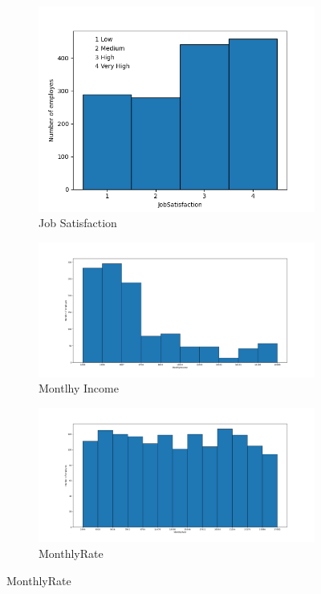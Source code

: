 \documentclass[english]{article}
\begin{document}
\newpage
\begin{figure} [h]
\centering
\begin{subfigure}{.5\textwidth}
  \centering
  \includegraphics[width=.8\linewidth]{JobSatisfaction.png}
  \caption{Job Satisfaction}
  \label{fig:sfig9}
\end{subfigure}%
\begin{subfigure}{.5\textwidth}
  \centering
  \includegraphics[width=.8\linewidth]{MonthlyIncome.png}
  \caption{Montlhy Income}
  \label{fig:sfig10}
\end{subfigure}
\begin{subfigure}{.5\textwidth}
  \centering
  \includegraphics[width=.8\linewidth]{MonthlyRate.png}
  \caption{MonthlyRate}
  \label{fig:sfig11}
\end{subfigure}%

\end{figure}
\end{document}
